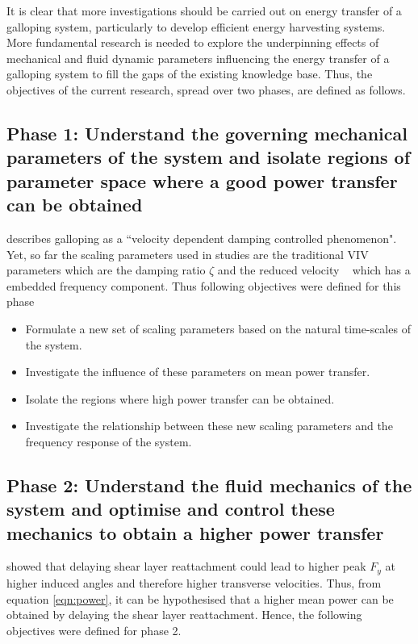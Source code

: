  It is clear that more investigations should be carried out on energy transfer of a galloping system, particularly to develop efficient energy harvesting systems. More fundamental research is needed to explore the underpinning effects of mechanical and fluid dynamic parameters influencing the energy transfer of a galloping system to fill the gaps of the existing knowledge base. Thus, the objectives of the current research, spread over two phases, are defined as follows.
 
 \subsection*{Phase 1: Understand the governing mechanical parameters of the system and isolate regions of parameter space where a good power transfer can be obtained}
 
 \citet{Paidoussis2010} describes galloping as a ``velocity dependent damping controlled phenomenon". Yet, so far the scaling parameters used in studies are the traditional VIV parameters which are the damping ratio $\zeta$ and the reduced velocity \ustar\ \citep{Barrero-Gil2010a} which has a embedded frequency component. Thus following objectives were defined for this phase 
 
 \begin{itemize}
\item Formulate a new set of scaling parameters based on the natural time-scales of the system.
\item Investigate the influence of these parameters on mean power transfer.
\item Isolate the regions where high power transfer can be obtained.
\item Investigate the relationship between these new scaling parameters and the frequency response of the system. 
 \end{itemize}
 
    
  \subsection*{Phase 2: Understand the fluid mechanics of the system and optimise and control these mechanics to obtain a higher power transfer}
  
  \citet{Luo1994} showed that delaying shear layer reattachment could lead to higher peak $F_{y}$ at higher induced angles and therefore higher transverse velocities. Thus, from equation \ref{eqn:power}, it can be hypothesised that a higher mean power can be obtained by delaying the shear layer reattachment. Hence, the following objectives were defined for phase 2. 
  
